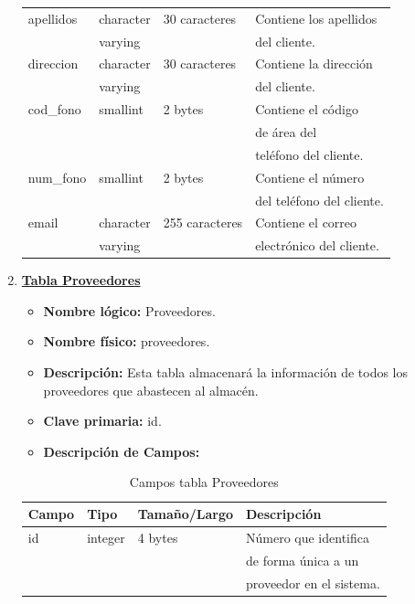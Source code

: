 \documentclass[letterpaper,12pt]{article}
\begin{document}
\begin{enumerate}
\begin{table}[!ht]
\begin{center}
\begin{tabular}{|l|l|l|l|}
\hline
apellidos & character & 30 caracteres & Contiene los apellidos\\
\mbox{} & varying & & del cliente. \\
\hline
direccion & character & 30 caracteres & Contiene la dirección\\
\mbox{} & varying & & del cliente.\\
\hline

cod\_fono & smallint & 2 bytes & Contiene el código\\
\mbox{} & \mbox{} & & de área del\\
\mbox{} & \mbox{} & & teléfono del cliente.\\
\hline
num\_fono & smallint & 2 bytes & Contiene el número\\
\mbox{} & \mbox{} & & del teléfono del cliente.\\
\hline
email & character & 255 caracteres & Contiene el correo\\
\mbox{} & varying & & electrónico del cliente.\\
\hline



\end{tabular}
\end{center}
\end{table}



\newpage

\item \textbf{\underline{Tabla Proveedores}}
\begin{itemize}
\item \textbf{Nombre lógico:} Proveedores.
\item \textbf{Nombre físico:} proveedores.
\item \textbf{Descripción:} Esta tabla almacenará la información de todos los proveedores que abastecen al almacén.
\item \textbf{Clave primaria:} id.
\item \textbf{Descripción de Campos:}
\end{itemize}

\begin{table}[!ht]
\caption{Campos tabla Proveedores}
\begin{center}
\begin{tabular}{|l|l|l|l|}
\hline
\textbf{Campo} \hspace*{2cm} & \textbf{Tipo} & \textbf{Tamaño/Largo} & \textbf{Descripción} \hspace*{3,5cm} \\
\hline
id & integer & 4 bytes&Número que identifica\\ 
\mbox{} & \mbox{} & &de forma única a un\\
\mbox{} & \mbox{} & &proveedor en el sistema.\\
\hline


\end{tabular}
\end{center}
\end{table}
\end{enumerate}
\end{document}
